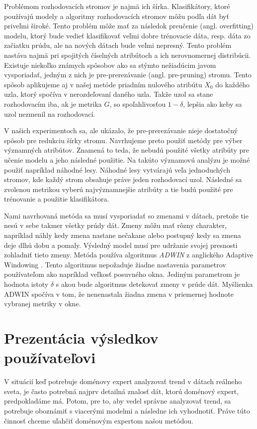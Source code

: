 \par
Problémom rozhodovacích stromov je najmä ich šírka. Klasifikátory, ktoré používajú modely a algoritmy rozhodovacích stromov môžu podľa dát byť priveľmi široké. Tento problém môže mať za následok preučenie (angl. overfitting) modelu, ktorý bude vedieť klasifikovať veľmi dobre trénovacie dáta, resp. dáta zo začiatku prúdu, ale na nových dátach bude veľmi nepresný. Tento problém nastáva najmä pri spojitých číselných atribútoch a ich nerovnomernej distribúcii. Existuje niekoľko známych spôsobov ako sa stýmto nežiadúcim javom vysporiadať, jedným z nich je pre-prerezávanie (angl. pre-pruning) stromu. Tento spôsob aplikujeme aj v našej metóde priadním nulového atribútu $X_0$ do každého uzla, ktorý spočíva v nerozdeľovaní daného uzla. Takže uzol sa stane rozhodovacím iba, ak je metrika $G$, so spoľahlivosťou $1-\delta$, lepšia ako keby sa uzol nezmenil na rozhodovací.
\par
V našich experimentoch sa, ale ukázalo, že pre-prerezávanie nieje dostatočný spôsob pre redukciu šírky stromu. Navrhujeme preto použiť metódy pre výber významných atribútov. Znamená to teda, že nebudú použité všetky atribúty pre učenie modelu a jeho následné použitie. Na takúto významovú analýzu je možné použiť napríklad náhodné lesy. Náhodné lesy vytvárajú veľa jednoduchých stromov, kde každý strom obsahuje práve jeden rozhodovací uzol. Následné sa zvolenou metrikou vyberú najvýznamnejšie atribúty a tie budú použité pre trénovanie a použitie klasifikátora.
\par
Nami navrhovaná metóda sa musí vysporiadať so zmenami v dátach, pretože tie nesú v sebe takmer všetky prúdy dát. Zmeny môžu mať rôzny charakter, napríklad náhly kedy zmena nastane nečakane alebo postupný kedy sa zmena deje dlhú dobu a pomaly. Výsledný model musí pre udržanie svojej presnosti zohladniť tieto zmeny. Metóda používa algoritmus \textit{ADWIN} z anglického Adaptive Windowing \citep{Hutchison2009}. Tento algoritmus nepožaduje žiadne nastavenia parametrov používateľom ako napríklad veľkosť posuvného okna. Jediným parametrom je hodnota istoty $\delta$ s akou bude algoritmus detekovať zmeny v prúde dát. Myšlienka ADWIN spočíva v tom, že nenenastala žiadna zmena v priemernej hodnote vybranej metriky v okne.




\section{Prezentácia výsledkov používateľovi}
\label{my-method-prezentacia-vysledkov}
V situácií keď potrebuje doménovy expert analyzovať trend v dátach reálneho sveta, je často potrebná najprv detailná znalosť dát, ktorú doménový expert, predpokladáme má. Potom, pre to, aby vedel správne analyzovať trend, sa potrebuje oboznámiť s viacerými modelmi a následne ich vyhodnotiť. Práve túto činnosť chceme uľahčiť doménovým expertom našou metódou.



